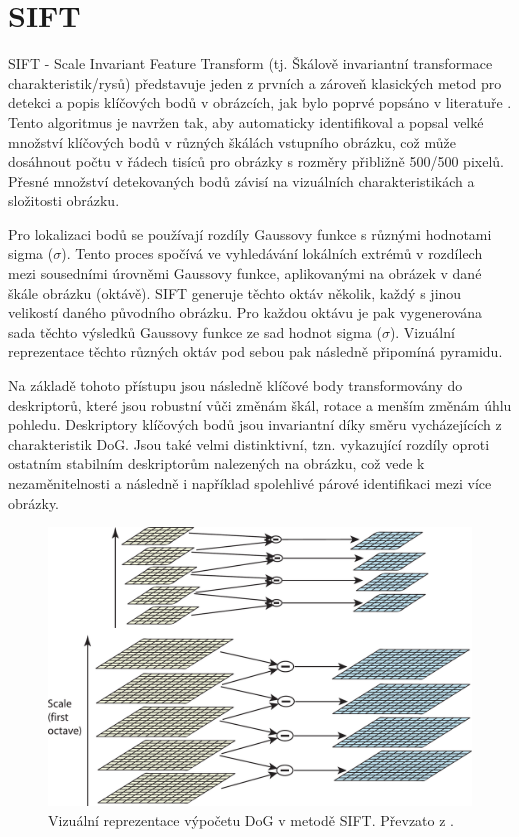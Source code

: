 \section{SIFT}
\label{sec:Chapter21}
SIFT - Scale Invariant Feature Transform (tj. Škálově invariantní transformace charakteristik/rysů) představuje jeden z prvních a zároveň klasických metod pro detekci a popis klíčových bodů v obrázcích, jak bylo poprvé popsáno v literatuře \cite{sift}. Tento algoritmus je navržen tak, aby automaticky identifikoval a popsal velké množství klíčových bodů v různých škálách vstupního obrázku, což může dosáhnout počtu v řádech tisíců pro obrázky s rozměry přibližně 500/500 pixelů. Přesné množství detekovaných bodů závisí na vizuálních charakteristikách a složitosti obrázku.

Pro lokalizaci bodů se používají rozdíly Gaussovy funkce s různými hodnotami sigma ($\sigma$). Tento proces spočívá ve vyhledávání lokálních extrémů v rozdílech mezi sousedními úrovněmi Gaussovy funkce, aplikovanými na obrázek v dané škále obrázku (oktávě). SIFT generuje těchto oktáv několik, každý s jinou velikostí daného původního obrázku. Pro každou oktávu je pak vygenerována sada těchto výsledků Gaussovy funkce ze sad hodnot sigma ($\sigma$). Vizuální reprezentace těchto různých oktáv pod sebou pak následně připomíná pyramidu.

Na základě tohoto přístupu jsou následně klíčové body transformovány do deskriptorů, které jsou robustní vůči změnám škál, rotace a menším změnám úhlu pohledu. Deskriptory klíčových bodů jsou invariantní díky směru vycházejících z charakteristik DoG. Jsou také velmi distinktivní, tzn. vykazující rozdíly oproti ostatním stabilním deskriptorům nalezených na obrázku, což vede k nezaměnitelnosti a následně i například spolehlivé párové identifikaci mezi více obrázky.

\begin{figure}[h]
\centering
\includegraphics[width=1.0\textwidth,keepaspectratio]{Figures/sift_dog.pdf}
\caption[Vizuální reprezentace výpočtu DoG v metodě SIFT]{Vizuální reprezentace výpočetu DoG v metodě SIFT. Převzato z \cite{sift}.}
\label{fig:sift_dog}
\end{figure}

